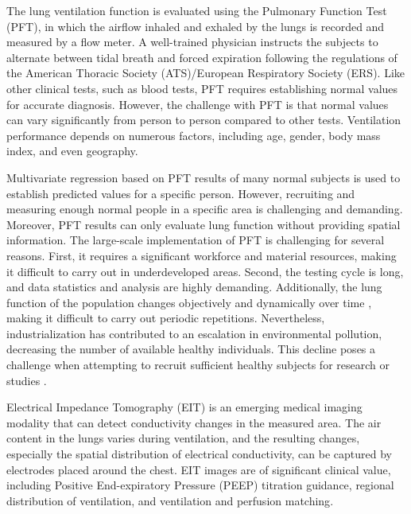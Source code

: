 \documentclass[journal,twoside,web]{ieeecolor}
\begin{document}
The lung ventilation function is evaluated using the Pulmonary Function Test (PFT), in which the airflow inhaled and exhaled by the lungs is recorded and measured by a flow meter. A well-trained physician instructs the subjects to alternate between tidal breath and forced expiration following the regulations of the American Thoracic Society (ATS)/European Respiratory Society (ERS)\cite{stanojevic2022ers}.
Like other clinical tests, such as blood tests, PFT requires establishing normal values for accurate diagnosis. However, the challenge with PFT is that normal values can vary significantly from person to person\cite{choi2005normal} compared to other tests. Ventilation performance depends on numerous factors, including age, gender, body mass index, and even geography\cite{hegewald2021impact, brandli1996lung}.

Multivariate regression based on PFT results of many normal subjects is used to establish predicted values for a specific person. However, recruiting and measuring enough normal people in a specific area is challenging and demanding. Moreover, PFT results can only evaluate lung function without providing spatial information.
The large-scale implementation of PFT is challenging for several reasons. First, it requires a significant workforce and material resources, making it difficult to carry out in underdeveloped areas. Second, the testing cycle is long, and data statistics and analysis are highly demanding. Additionally, the lung function of the population changes objectively and dynamically over time \cite{talman2021pulmonary}, making it difficult to carry out periodic repetitions. Nevertheless, industrialization has contributed to an escalation in environmental pollution, decreasing the number of available healthy individuals. This decline poses a challenge when attempting to recruit sufficient healthy subjects for research or studies \cite{zhu2012}.


Electrical Impedance Tomography (EIT) is an emerging medical imaging modality that can detect conductivity changes in the measured area. The air content in the lungs varies during ventilation, and the resulting changes, especially the spatial distribution of electrical conductivity, can be captured by electrodes placed around the chest\cite{brown2003electrical}. EIT images are of significant clinical value\cite{ sang2020narrative, frerichs2000electrical}, including Positive End-expiratory Pressure (PEEP) titration guidance\cite{franchineau2017bedside}, regional distribution of ventilation\cite{frerichs2016regional}, and ventilation and perfusion matching\cite{spinelli2021unmatched,liu2022prone}.
\end{document}
